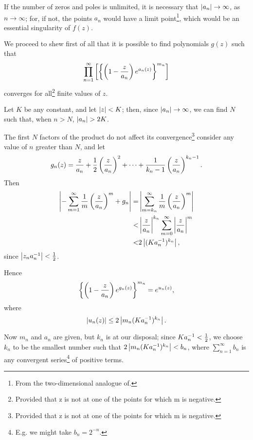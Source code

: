 If the number of zeros and poles is unlimited, it is necessary that
$\left| a_{n} \right| \rightarrow \infty$, as $n \rightarrow \infty$;
for, if not, the points $a_{n}$ would have a limit
point\footnote{From the two-dimensional analogue
  of.}, 
which would be an essential singularity of $f(z)$.

We proceed to shew first of all that it is possible to find
polynomials $g(z)$ such that
$$
\prod_{n=1}^{\infty}
\left[ 
  \left\{ 
    \left( 
      1
      -
      \frac{z}{a_{n}}
     \right)
    e^{a_{n}(z)}
   \right\}^{m_{n}}
 \right]
$$
converges for all\footnote{Provided that z is not at one of the points
  for which m is negative.} finite values of $z$.

Let $K$ be any constant, and let $\left| z \right| < K$; then, since
$\left| a_{n} \right| \rightarrow \infty$, we can
find $N$ such that, when $n > N$, $\left| a_{n} \right| > 2K$.

The first $N$ factors of the product do not affect its
convergence\footnote{Provided that z is not at one of the points
  for which m is negative.} %
consider any value of $n$ greater than $N$, and let
$$
g_{n}(z)
=
\frac{z}{a_{n}}
+
\frac{1}{2} \left(  \frac{z}{a_{n}}  \right)^{2}
+
\cdots
+
\frac{1}{k_{n}-1}
\left(  \frac{z}{a_{n}}  \right)^{k_{n} - 1}.
$$
Then
\begin{align*}
  \left| 
    -
    \sum_{m=1}^{\infty}
    \frac{1}{m}
    \left( 
      \frac{z}{a_{n}}
     \right)^{m}
    +
    g_{n}
   \right|
  =&
  \left| 
    \sum_{m=k_{n}}^{\infty}
    \frac{1}{m}
    \left( 
      \frac{z}{a_{n}}
     \right)^{m}
   \right|
  \\
  <&
  \left|  \frac{z}{a_{n}}  \right|^{k_{n}}
  \sum_{m=0}^{\infty}
  \left|  \frac{z}{a_{n}}  \right|^{m}
  \\
  <&
  2
  \left|  (K a_{n}^{-1})^{k_{n}}   \right|,
\end{align*}
since
$ \left|  z_{n} a_{n}^{-1}  \right| < \frac{1}{2}$.

Hence
$$
\left\{ 
  \left( 
    1
    -
    \frac{z}{a_{n}}
   \right)
  e^{g_{n}(z)}
 \right\}^{m_{n}}
=
e^{u_{n}(z)},
$$
where
$$
\left|  u_{n}(z)  \right|
\leq
2
\left| 
  m_{n}
  (K a_{n}^{-1})^{k_{n}}
 \right|.
$$

Now $m_{n}$ and $a_{n}$ are given, but $k_{n}$ is at our disposal;
since $K a_{n}^{-1} < \frac{1}{2}$, we
choose $k_{n}$ to be the smallest number such that
$2 \left| m_{n} (K a_{n}^{-1})^{k_{n}} \right| < b_{n}$,
where
$\sum_{n=1}^{\infty} b_{n}$ is any convergent series\footnote{E.g. we
  might take $b_{n} = 2^{-n}$.} of positive terms.

